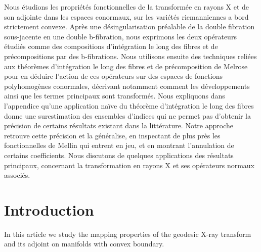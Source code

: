 \documentclass[JEP,XML,SOM,Unicode,NoFloatCountersInSection, NoEqCountersInSection,published]{cedram}
\theoremstyle{plain}
\theoremstyle{definition}
\theoremstyle{remark}
\begin{document}

\begin{altabstract}
Nous étudions les propriétés fonctionnelles de la transformée en rayons X et de son adjointe dans les espaces conormaux, sur les variétés riemanniennes a bord strictement convexe. Après une désingularisation préalable de la double fibration sous-jacente en une double b-fibration, nous exprimons les deux opérateurs étudiés comme des compositions d'intégration le long des fibres et de précompositions par des b-fibrations. Nous utilisons ensuite des techniques reliées aux théorèmes d'intégration le long des fibres et de précomposition de Melrose pour en déduire l'action de ces opérateurs sur des espaces de fonctions polyhomogènes conormales, décrivant notamment comment les développements ainsi que les termes principaux sont transformés. Nous expliquons dans l'appendice qu'une application naïve du théorème d'intégration le long des fibres donne une surestimation des ensembles d'indices qui ne permet pas d'obtenir la précision de certains résultats existant dans la littérature. Notre approche retrouve cette précision et la généralise, en inspectant de plus près les fonctionnelles de Mellin qui entrent en jeu, et en montrant l'annulation de certains coefficients. Nous discutons de quelques applications des résultats principaux, concernant la transformation en rayons X et ses opérateurs normaux associés.
\end{altabstract}

\maketitle
\vspace*{-\baselineskip}
\tableofcontents

\mainmatter
\section{Introduction}\label{sec:intro}
In this article we study the mapping properties of the geodesic X-ray transform and its adjoint on manifolds with convex boundary.
\end{document}
